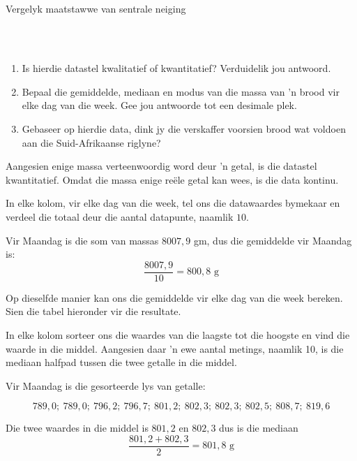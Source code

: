 \begin{wex}{
Vergelyk maatstawwe van sentrale neiging
}
{\begin{center}
\begin{tabular}{|c|c|c|c|c|c|c|}
      \end{tabular}
    \end{center}
\vspace{8pt}\\
    \begin{enumerate}[noitemsep, label=\textbf{\arabic*}.]
    \item Is hierdie datastel kwalitatief of kwantitatief? Verduidelik jou antwoord.
    \item Bepaal die gemiddelde, mediaan en modus van die massa van ’n brood vir elke dag van die week. Gee jou antwoorde tot een desimale plek.
    \item Gebaseer op hierdie data, dink jy die verskaffer voorsien brood wat voldoen aan die Suid-Afrikaanse riglyne?
    \end{enumerate}
}{

  Aangesien enige massa verteenwoordig word deur ’n getal, is die datastel kwantitatief. Omdat die massa enige reële getal kan wees, is die data kontinu.


 In elke kolom, vir elke dag van die week, tel ons die datawaardes bymekaar en verdeel die totaal deur die aantal datapunte, naamlik $10$.

  Vir Maandag is die som van massas $8007,9$ gm, dus die gemiddelde vir Maandag is:
  \begin{equation*}
    \frac{8007,9}{10} = 800,8\mbox{ g}
  \end{equation*}

  Op dieselfde manier kan ons die gemiddelde vir elke dag van die week bereken. Sien die tabel hieronder vir die resultate.


  In elke kolom sorteer ons die waardes van die laagste tot die hoogste en vind die waarde in die middel. Aangesien daar ’n ewe aantal metings, naamlik 10, is die mediaan halfpad tussen die twee getalle in die middel.

  Vir Maandag is die gesorteerde lys van getalle:

  \begin{equation*}
    789,0;\ 789,0;\ 796,2;\ 796,7;\ 801,2;\ 802,3;\ 802,3;\ 802,5;\ 808,7;\ 819,6
  \end{equation*}

  Die twee waardes in die middel is $801,2$ en $802,3$ dus is die mediaan
  \begin{equation*}
    \frac{801,2 + 802,3}{2} = 801,8\mbox{ g}
  \end{equation*}

}
\end{wex}
